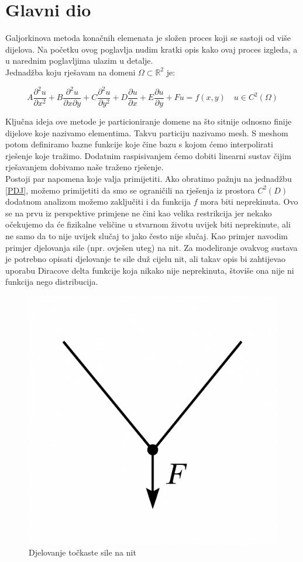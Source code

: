 \documentclass[zavrsnirad]{../fer}
\begin{document}
\chapter{Glavni dio}
\label{pog:glavni_dio}
Galjorkinova metoda konačnih elemenata je složen proces
koji se sastoji od više dijelova. Na početku ovog 
poglavlja nudim kratki opis kako ovaj proces izgleda, a
u narednim poglavljima ulazim u detalje.
\bigskip
\\ 
Jednadžba koju rješavam na domeni $\Omega \subset \mathbb{R}^2$ je:

\begin{equation}
	\label{PDJ}
  A \frac{\partial^2 u}{\partial x^2}
	+ B \frac{\partial^2 u}{\partial x \partial y}
	+ C \frac{\partial^2 u}{\partial y^2}
	+ D \frac{\partial u}{\partial x}
	+ E \frac{\partial u}{\partial y}
	+ F u = f(x,y)
  \quad u \in C^2(\Omega)
\end{equation}

Ključna ideja ove metode je particioniranje domene na
što sitnije odnosno finije dijelove koje nazivamo elementima.
Takvu particiju nazivamo mesh. S meshom potom definiramo
bazne funkcije koje čine bazu s kojom ćemo interpolirati
rješenje koje tražimo. Dodatnim raspisivanjem ćemo dobiti
linearni sustav čijim rješavanjem dobivamo naše traženo
rješenje.
\bigskip
\\ 
\label{uvjetNaf}
Postoji par napomena koje valja primijetiti. Ako obratimo
pažnju na jednadžbu \eqref{PDJ}, možemo primijetiti da smo
se ograničili na rješenja iz prostora $C^2(D)$ dodatnom analizom
možemo zaključiti i da funkcija $f$ mora biti neprekinuta.
Ovo se na prvu iz perspektive primjene ne čini kao velika 
restrikcija jer nekako očekujemo da će fizikalne veličine u 
stvarnom životu uvijek biti neprekinute, ali ne samo da to nije
uvijek slučaj to jako često nije slučaj. Kao primjer navodim 
primjer djelovanja sile (npr. ovješen uteg) na nit. Za modeliranje
ovakvog sustava je potrebno opisati djelovanje te sile duž
cijelu nit, ali takav opis bi zahtijevao uporabu Diracove delta 
funkcije koja nikako nije neprekinuta, štoviše ona nije
ni funkcija nego distribucija.

\begin{figure}[htb]
	\centering
	\includegraphics[width=0.38\linewidth]{Figures/nit.png}
	\caption{Djelovanje točkaste sile na nit}
	\label{nit}
\end{figure}
\end{document}
